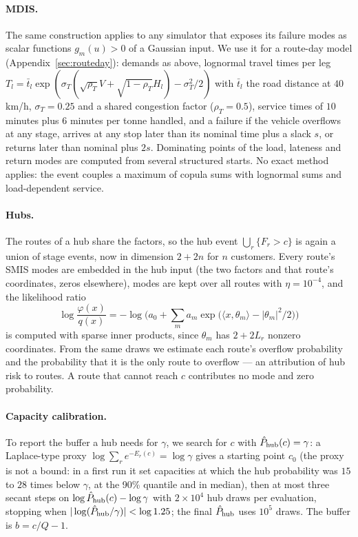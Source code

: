 \documentclass[ijoc,sglanonrev]{informs4}
\begin{document}
\paragraph{MDIS.} The same construction applies to any simulator that exposes
its failure modes as scalar functions $g_m(u) > 0$ of a Gaussian input. We
use it for a route-day model (Appendix~\ref{sec:routeday}): demands as above,
lognormal travel times per leg $T_l=\bar t_l\exp(\sigma_T(\sqrt{\rho_T}V+
\sqrt{1-\rho_T}H_l)-\sigma_T^2/2)$ with $\bar t_l$ the road distance at
$40$\,km/h, $\sigma_T=0.25$ and a shared congestion factor ($\rho_T=0.5$),
service times of $10$ minutes plus $6$ minutes per tonne handled, and a failure
if the vehicle overflows at any stage, arrives at any stop later than its
nominal time plus a slack $s$, or returns later than nominal plus $2s$.
Dominating points of the load, lateness and return modes are computed from
several structured starts. No exact method applies: the event couples a
maximum of copula sums with lognormal sums and load-dependent service.

\paragraph{Hubs.} The routes of a hub share the factors, so the hub event
$\bigcup_r\{F_r > c\}$ is again a union of stage events, now in dimension
$2+2n$ for $n$ customers. Every route's SMIS modes are embedded in the hub
input (the two factors and that route's coordinates, zeros elsewhere), modes
are kept over all routes with $\eta=10^{-4}$, and the likelihood ratio
\[
\log\frac{\varphi(x)}{q(x)} = -\log\Big(a_0+\sum_m a_m\exp\big(\langle x,\theta_m\rangle-|\theta_m|^2/2\big)\Big)
\]
is computed with sparse inner products, since $\theta_m$ has $2+2L_r$ nonzero
coordinates. From the same draws we estimate each route's overflow
probability and the probability that it is the only route to overflow --- an
attribution of hub risk to routes. A route that cannot reach $c$ contributes
no mode and zero probability.

\paragraph{Capacity calibration.} To report the buffer a hub needs for
$\gamma$, we search for $c$ with $\hat P_{\rm hub}(c)=\gamma$: a Laplace-type
proxy $\log\sum_r e^{-E_r(c)}=\log\gamma$ gives a starting point $c_0$ (the
proxy is not a bound: in a first run it set capacities at which the hub
probability was $15$ to $28$ times below $\gamma$, at the 90\% quantile and
in median), then at most
three secant steps on $\log\hat P_{\rm hub}(c)-\log\gamma$ with $2\times10^4$
hub draws per evaluation, stopping when $|\log(\hat P_{\rm hub}/\gamma)|<\log1.25$;
the final $\hat P_{\rm hub}$ uses $10^5$ draws. The buffer is $b=c/Q-1$.
\end{document}
